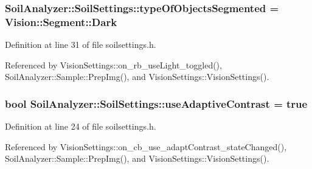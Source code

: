 \hypertarget{class_soil_analyzer_1_1_soil_settings_a21ae88dba6b9b0b07d9c26812bc739fb}{}
\subsubsection[{type\+Of\+Objects\+Segmented}]{ Soil\+Analyzer\+::\+Soil\+Settings\+::type\+Of\+Objects\+Segmented = {\bf Vision\+::\+Segment\+::\+Dark}}\label{class_soil_analyzer_1_1_soil_settings_a21ae88dba6b9b0b07d9c26812bc739fb}


Definition at line 31 of file soilsettings.\+h.



Referenced by Vision\+Settings\+::on\+\_\+rb\+\_\+use\+Light\+\_\+toggled(), Soil\+Analyzer\+::\+Sample\+::\+Prep\+Img(), and Vision\+Settings\+::\+Vision\+Settings().

\hypertarget{class_soil_analyzer_1_1_soil_settings_a0e27335d05aed8f3f084744062368578}{}
\subsubsection[{use\+Adaptive\+Contrast}]{\setlength{\rightskip}{0pt plus 5cm}bool Soil\+Analyzer\+::\+Soil\+Settings\+::use\+Adaptive\+Contrast = true}\label{class_soil_analyzer_1_1_soil_settings_a0e27335d05aed8f3f084744062368578}


Definition at line 24 of file soilsettings.\+h.



Referenced by Vision\+Settings\+::on\+\_\+cb\+\_\+use\+\_\+adapt\+Contrast\+\_\+state\+Changed(), Soil\+Analyzer\+::\+Sample\+::\+Prep\+Img(), and Vision\+Settings\+::\+Vision\+Settings().

\hypertarget{class_soil_analyzer_1_1_soil_settings_a21bd246a48a712734af86f592030e18b}{}
